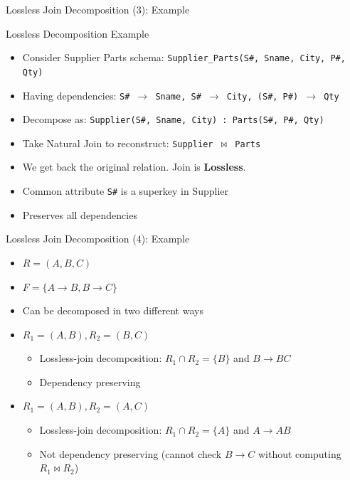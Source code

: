 \documentclass[aspectratio=169, xcolor=dvipsnames]{beamer}
\begin{document}
\begin{frame}{Lossless Join Decomposition (3): Example}
    \begin{exampleblock}{Lossless Decomposition Example}
        \begin{itemize}[<+->]
            \item Consider Supplier Parts schema: \texttt{Supplier\_Parts(S\#, Sname, City, P\#, Qty)}
            \item Having dependencies: \texttt{S\# $\rightarrow$ Sname, S\# $\rightarrow$ City, (S\#, P\#) $\rightarrow$ Qty}
            \item Decompose as: \texttt{Supplier(S\#, Sname, City) : Parts(S\#, P\#, Qty)}
            \item Take Natural Join to reconstruct: \texttt{Supplier $\bowtie$ Parts}
            \item We get back the original relation. Join is \textbf{Lossless}.
            \item Common attribute \texttt{S\#} is a superkey in Supplier
            \item Preserves all dependencies
        \end{itemize}
    \end{exampleblock}
\end{frame}

\begin{frame}{Lossless Join Decomposition (4): Example}
    \begin{itemize}[<+->]
        \item $R = (A, B, C)$
        \item $F = \{A \rightarrow B, B \rightarrow C\}$
        \item Can be decomposed in two different ways
        \item $R_1 = (A, B), R_2 = (B, C)$
        \begin{itemize}
            \item[$\triangleright$] Lossless-join decomposition: $R_1 \cap R_2 = \{B\}$ and $B \rightarrow BC$
            \item[$\triangleright$] Dependency preserving
        \end{itemize}
        \item $R_1 = (A, B), R_2 = (A, C)$
        \begin{itemize}
            \item[$\triangleright$] Lossless-join decomposition: $R_1 \cap R_2 = \{A\}$ and $A \rightarrow AB$
            \item[$\triangleright$] Not dependency preserving (cannot check $B \rightarrow C$ without computing $R_1 \bowtie R_2$)
        \end{itemize}
    \end{itemize}
\end{frame}
\end{document}
